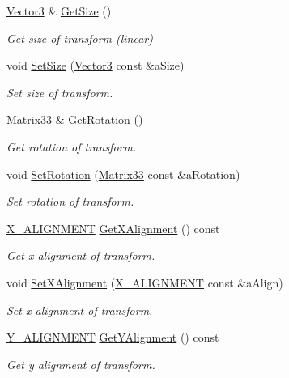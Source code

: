 \begin{DoxyCompactItemize}
\hyperlink{structVector3}{Vector3} \& \hyperlink{classTransform_a4964c6e758a687de093a285da8a65fdb}{Get\+Size} ()
\begin{DoxyCompactList}\small\item\em Get size of transform (linear) \end{DoxyCompactList}\item 
void \hyperlink{classTransform_a7f6af0730c1500ba97d7730ea39d4742}{Set\+Size} (\hyperlink{structVector3}{Vector3} const \&a\+Size)
\begin{DoxyCompactList}\small\item\em Set size of transform. \end{DoxyCompactList}\item 
\hyperlink{structMatrix33}{Matrix33} \& \hyperlink{classTransform_aa56be2b3f8898381b7ddbeedac4c03c2}{Get\+Rotation} ()
\begin{DoxyCompactList}\small\item\em Get rotation of transform. \end{DoxyCompactList}\item 
void \hyperlink{classTransform_ada048b0e3e27e0a4eae841e7511b4319}{Set\+Rotation} (\hyperlink{structMatrix33}{Matrix33} const \&a\+Rotation)
\begin{DoxyCompactList}\small\item\em Set rotation of transform. \end{DoxyCompactList}\item 
\hyperlink{MathExt_8h_a0792b703e89c99d4c39f13e093992576}{X\+\_\+\+A\+L\+I\+G\+N\+M\+E\+NT} \hyperlink{classTransform_ab1e4769dc68b8b4d6f4637b63c7340bb}{Get\+X\+Alignment} () const 
\begin{DoxyCompactList}\small\item\em Get x alignment of transform. \end{DoxyCompactList}\item 
void \hyperlink{classTransform_abc18e8fa2582d91c918e7c8fa3ed80b3}{Set\+X\+Alignment} (\hyperlink{MathExt_8h_a0792b703e89c99d4c39f13e093992576}{X\+\_\+\+A\+L\+I\+G\+N\+M\+E\+NT} const \&a\+Align)
\begin{DoxyCompactList}\small\item\em Set x alignment of transform. \end{DoxyCompactList}\item 
\hyperlink{MathExt_8h_a0de91f93b1c4a18a768f6070ddc579b4}{Y\+\_\+\+A\+L\+I\+G\+N\+M\+E\+NT} \hyperlink{classTransform_a629ab06a9aac92c784e57919f8ec1abb}{Get\+Y\+Alignment} () const 
\begin{DoxyCompactList}\small\item\em Get y alignment of transform. \end{DoxyCompactList}\item 

\end{DoxyCompactItemize}
